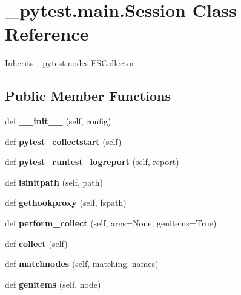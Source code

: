 \hypertarget{class__pytest_1_1main_1_1_session}{}\section{\+\_\+pytest.\+main.\+Session Class Reference}
\label{class__pytest_1_1main_1_1_session}


Inherits \hyperlink{class__pytest_1_1nodes_1_1_f_s_collector}{\+\_\+pytest.\+nodes.\+F\+S\+Collector}.

\subsection*{Public Member Functions}
\begin{DoxyCompactItemize}
\item 
\mbox{\label{class__pytest_1_1main_1_1_session_a58fbcc50c3a2b8ecba88f0aac9440588}} 
def {\bfseries \+\_\+\+\_\+init\+\_\+\+\_\+} (self, config)
\item 
\mbox{\label{class__pytest_1_1main_1_1_session_ae28b7081a99c137386966fdfebb6de89}} 
def {\bfseries pytest\+\_\+collectstart} (self)
\item 
\mbox{\label{class__pytest_1_1main_1_1_session_a49889e9e73fd5953c2a5470890c76383}} 
def {\bfseries pytest\+\_\+runtest\+\_\+logreport} (self, report)
\item 
\mbox{\label{class__pytest_1_1main_1_1_session_a101f813287060a9b00e0c44b9fd55733}} 
def {\bfseries isinitpath} (self, path)
\item 
\mbox{\label{class__pytest_1_1main_1_1_session_afd92fc17d28aa643782d2a1df5f9c429}} 
def {\bfseries gethookproxy} (self, fspath)
\item 
\mbox{\label{class__pytest_1_1main_1_1_session_a45d88e1cf4b7ec8bbccdc968296125f0}} 
def {\bfseries perform\+\_\+collect} (self, args=None, genitems=True)
\item 
\mbox{\label{class__pytest_1_1main_1_1_session_a021226a212fc8fb6c481a6a586529ab1}} 
def {\bfseries collect} (self)
\item 
\mbox{\label{class__pytest_1_1main_1_1_session_a801174001b385f76aeeffcf49685a160}} 
def {\bfseries matchnodes} (self, matching, names)
\item 
\mbox{\label{class__pytest_1_1main_1_1_session_a8c845c2674af799f39ad1aae31749b57}} 
def {\bfseries genitems} (self, node)
\end{DoxyCompactItemize}
